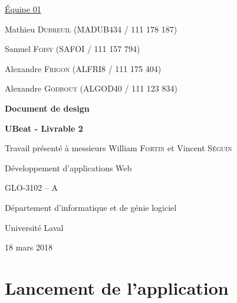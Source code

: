 \documentclass[12pt, letterpaper]{article}
\begin{document}
    \begin{titlepage}
        {\setlength{\parindent}{0pt}
            \underline{Équipe 01} \par
            Mathieu \textsc{Dubreuil} (MADUB434 / 111 178 187) \par
            Samuel \textsc{Foisy} (SAFOI / 111 157 794) \par
            Alexandre \textsc{Frigon} (ALFRI8 / 111 175 404) \par
            Alexandre \textsc{Godbout} (ALGOD40 / 111 123 834) \par
        }

        \begin{center}
            \vspace{4cm}
            {\Large\textbf{Document de design} \par}
            {\large\textbf{UBeat - Livrable 2} \par}

            \vspace{2cm}
            {\large Travail présenté à messieurs William \textsc{Fortin} et Vincent \textsc{Séguin} \par}

            \vspace{1.25cm}
            {\large
                Développement d'applications Web \par
                GLO-3102 -- A \par
            }

            \vfill
            Département d’informatique et de génie logiciel \par
            Université Laval \par
            18 mars 2018 \par
        \end{center}
    \end{titlepage}
    
    \section*{Lancement de l'application}
\end{document}
